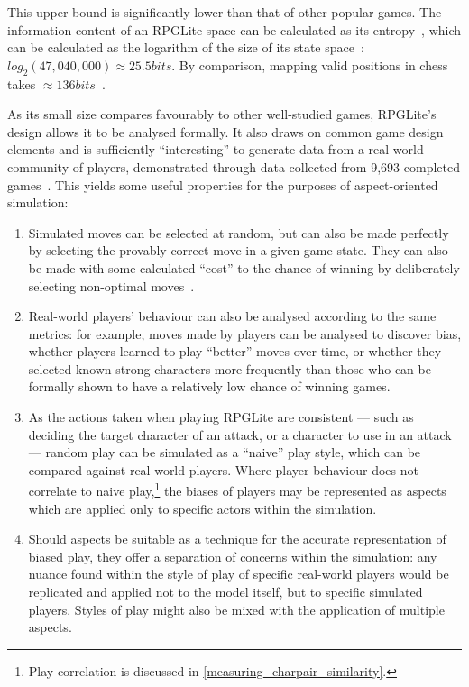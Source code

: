 This upper bound is significantly lower than that of other popular games. The
information content of an RPGLite space can be calculated as its
entropy~\cite{shannon_mathematical_theory_of_communication}, which can be
calculated as the logarithm of the size of its state
space~\cite{hartley_transmission_of_information}: $log_2(47,040,000) \approx
25.5bits$. By comparison, mapping valid positions in chess takes
$\approx{}136bits$~\cite{information_content_chess}.

As its  small size compares favourably to other well-studied games,
RPGLite's design allows it to be analysed formally. It also draws on
common game design elements and is sufficiently ``interesting'' to generate data
from a real-world community of players, demonstrated through data collected from
9,693 completed games~\cite{rpglite_dataset}.
This yields some useful properties for the purposes of aspect-oriented
simulation:

\begin{enumerate}
  \item Simulated moves can be selected at random, but can also be made
    perfectly by selecting the provably correct move in a given game state. They
    can also be made with some calculated ``cost'' to the chance of winning by
    deliberately selecting non-optimal moves~\cite{kavanagh2021thesis}.
  \item Real-world players' behaviour can also be analysed according to the same
    metrics: for example, moves made by players can be analysed to discover
    bias, whether players learned to play ``better'' moves over time, or whether
    they selected known-strong characters more frequently than those who can be
    formally shown to have a relatively low chance of winning games.
  \item As the actions taken when playing RPGLite are consistent --- such as
    deciding the target character of an attack, or a character to use in an
    attack --- random play can be simulated as a ``naive'' play style, which can
    be compared against real-world players. Where player behaviour does not
    correlate to naive play,\footnote{Play correlation is discussed in
    \cref{measuring_charpair_similarity}.} the biases of players may be
    represented as aspects which are applied only to specific actors within the
    simulation.
  \item Should aspects be suitable as a technique for the accurate
    representation of biased play, they offer a separation of concerns within
    the simulation: any nuance found within the style of play of specific
    real-world players would be replicated and applied not to the model itself,
    but to specific simulated players. Styles of play might also be mixed with
    the application of multiple aspects.
\end{enumerate}

